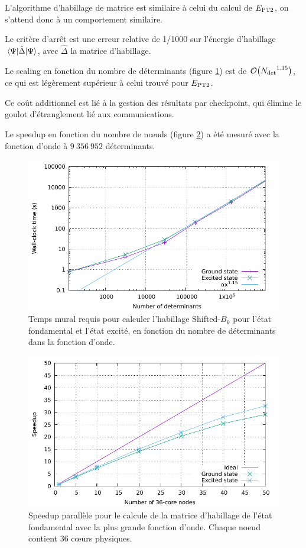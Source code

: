 \documentclass[./thesis.tex]{subfiles}
\begin{document}
L'algorithme d'habillage de matrice est similaire à celui du calcul de $E_\text{PT2}$, on s'attend donc à un comportement similaire.

Le critère d’arrêt est une erreur relative de 1/1000 sur l'énergie d'habillage $\mel{\Psi}{\hat \Delta}{\Psi}$, avec $\hat \Delta$ la matrice d'habillage.

Le scaling en fonction du nombre de déterminants (figure \ref{fig:scaling_det_sbk_fr}) est de $\order{\Ndet^{1.15}}$, ce qui est légèrement supérieur à celui trouvé pour $E_\text{PT2}$. 

Ce coût additionnel est lié à la gestion des résultats par checkpoint, qui élimine le goulot d'étranglement lié aux communications. 

Le speedup en fonction du nombre de nœuds (figure \ref{fig:scaling_node_sbk_fr}) a été mesuré avec la fonction d'onde à $9~356~952$ déterminants.

\begin{figure}[h!]
        \begin{center}
                \includegraphics[width=0.8\columnwidth]{figures/perf/scaling_sbk_det}
                \caption{Temps mural requis pour calculer l'habillage Shifted-$B_k$ pour l'état fondamental et l'état excité, en fonction du nombre de déterminants dans la fonction d'onde.}
                \label{fig:scaling_det_sbk_fr}
        \end{center}
\end{figure}
\begin{figure}[hbt!]
        \begin{center}
                \includegraphics[width=0.8\columnwidth]{figures/perf/scaling_sbk_node}
                \caption{Speedup parallèle pour le calcule de la matrice d'habillage de l'état fondamental avec la plus grande fonction d'onde. Chaque noeud contient 36 cœurs physiques.}
                \label{fig:scaling_node_sbk_fr}
        \end{center}
\end{figure}
\end{document}
